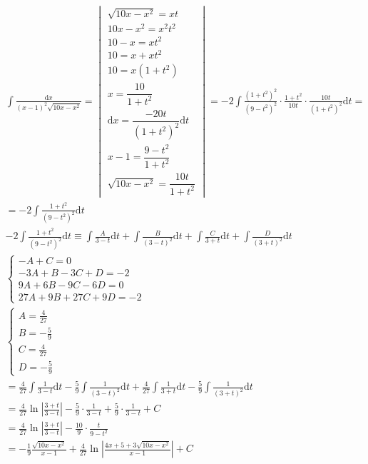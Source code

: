 \begin{gather*}
\int{\frac{\mbox{d}x}{(x-1)^2\sqrt{10x-x^2}}} =
\begin{vmatrix}
  \sqrt{10x-x^2}=xt\\
  10x-x^2=x^2t^2\\
  10-x=xt^2\\
  10=x+xt^2\\
  10=x(1+t^2)\\
  x=\dfrac{10}{1+t^2}\\
  \mbox{d}x=\dfrac{-20t}{(1+t^2)^2}\mbox{d}t\\
  x-1=\dfrac{9-t^2}{1+t^2}\\
  \sqrt{10x-x^2}=\dfrac{10t}{1+t^2}
\end{vmatrix}
= -2\int{\frac{(1+t^2)^2}{(9-t^2)^2}\cdot \frac{1+t^2}{10t}\cdot \frac{10t}{(1+t^2)^2}\mbox{d}t} = \\
= -2\int{\frac{1+t^2}{(9-t^2)^2}\mbox{d}t} \\
  -2 \int{\frac{1+t^2}{(9-t^2)^2}\mbox{d}t}
    \equiv
  \int{\frac{A}{3-t}\mbox{d}t}+\int{\frac{B}{(3-t)^2}\mbox{d}t}+\int{\frac{C}{3+t}\mbox{d}t}+\int{\frac{D}{(3+t)^2}\mbox{d}t} \\
\begin{cases}
  -A+C=0\\
  -3A+B-3C+D=-2\\
  9A+6B-9C-6D=0\\
  27A+9B+27C+9D=-2
\end{cases}\\
\begin{cases}
  A=\frac{4}{27}\\
  B=-\frac{5}{9}\\
  C=\frac{4}{27}\\
  D=-\frac{5}{9}
\end{cases}\\
= \frac{4}{27}\int{\frac{1}{3-t}\mbox{d}t}-\frac{5}{9}\int{\frac{1}{(3-t)^2}\mbox{d}t}+\frac{4}{27}\int{\frac{1}{3+t}\mbox{d}t}-\frac{5}{9}\int{\frac{1}{(3+t)^2}\mbox{d}t}\\
= \frac{4}{27}\ln{\left|\frac{3+t}{3-t}\right|}-\frac{5}{9}\cdot \frac{1}{3-t}+\frac{5}{9}\cdot \frac{1}{3-t}+C\\
= \frac{4}{27}\ln{\left|\frac{3+t}{3-t}\right|}-\frac{10}{9} \cdot \frac{t}{9-t^2}\\
= -\frac{1}{9}\frac{\sqrt{10x-x^2}}{x-1}+\frac{4}{27}\ln{\left|\frac{4x+5+3\sqrt{10x-x^2}}{x-1}\right|}+C
\end{gather*}




